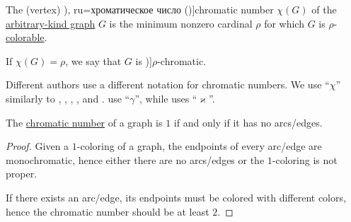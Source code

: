 \begin{definition}\label{def:graph_chromatic_number}
  The (vertex) \term[bg=хроматично число (\cite[142]{Мирчев2001}), ru=хроматическое число (\cite[235]{Емеличев1990})]{chromatic number} \( \chi(G) \) of the \hyperref[rem:arbitrary_kind_graph]{arbitrary-kind graph} \( G \) is the minimum nonzero cardinal \( \rho \) for which \( G \) is \( \rho \)-\hyperref[def:graph_coloring/colorable]{colorable}.

  If \( \chi(G) = \rho \), we say that \( G \) is \term[ru=\( \rho \)-хроматический (граф) (\cite[236]{Емеличев1990})]{\( \rho \)-chromatic}.
\end{definition}
\begin{comments}
  \item Different authors use a different notation for chromatic numbers. We use \enquote{\( \chi \)} similarly to , , , ,  and .  use \enquote{\( \gamma \)}, while  uses \enquote{\( \varkappa \)}.
\end{comments}

\begin{proposition}\label{thm:chromatic_number_edgeless}
  The \hyperref[def:graph_chromatic_number]{chromatic number} of a graph is \( 1 \) if and only if it has no arcs/edges.
\end{proposition}
\begin{proof}
  \SufficiencySubProof Given a \( 1 \)-coloring of a graph, the endpoints of every arc/edge are monochromatic, hence either there are no arcs/edges or the \( 1 \)-coloring is not proper.

  \NecessitySubProof If there exists an arc/edge, its endpoints must be colored with different colors, hence the chromatic number should be at least \( 2 \).
\end{proof}


